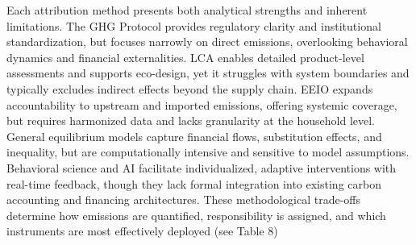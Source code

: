 \documentclass[12pt,a4paper]{article}%
\begin{document}
Each attribution method presents both analytical strengths and inherent limitations. The GHG Protocol provides regulatory clarity and institutional standardization, but focuses narrowly on direct emissions, overlooking behavioral dynamics and financial externalities. LCA enables detailed product-level assessments and supports eco-design, yet it struggles with system boundaries and typically excludes indirect effects beyond the supply chain. EEIO expands accountability to upstream and imported emissions, offering systemic coverage, but requires harmonized data and lacks granularity at the household level. General equilibrium models capture financial flows, substitution effects, and inequality, but are computationally intensive and sensitive to model assumptions. Behavioral science and AI facilitate individualized, adaptive interventions with real-time feedback, though they lack formal integration into existing carbon accounting and financing architectures. These methodological trade-offs determine how emissions are quantified, responsibility is assigned, and which instruments are most effectively deployed (see Table 8)
\end{document}
